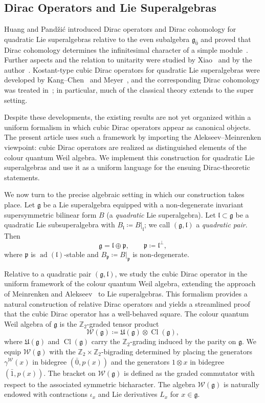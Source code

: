 \documentclass[11pt]{amsart}
\newcommand{\ad}{\operatorname{ad}}
\def\WW{{\mathcal{W}}}
\def\Weil{{\mathcal{W}(\gg)}}
\def\Cl{{\operatorname{Cl}}}
\def\pp{{\mathfrak p}}
\def\ll{{\mathfrak l}}
\def\even{{\mathfrak{g}_{\bar{0}}}}
\def\pp{{\mathfrak p}}
\def\pp{{\mathfrak{p}}}
\def\gg{{\mathfrak{g}}}
\def\ZZ{{\mathbb Z}}
\def\UE{{\mathfrak U}}
\theoremstyle{plain}
\theoremstyle{remark}
\theoremstyle{definition}
\numberwithin{equation}{section}
\theoremstyle{remark}
\begin{document}
\subsection{Dirac Operators and Lie Superalgebras} Huang and Pand\v zi\'c introduced Dirac operators and Dirac cohomology for quadratic Lie superalgebras relative to the even subalgebra $\even$
and proved that Dirac cohomology determines the infinitesimal character of a simple module~\cite{huang2005dirac}. Further aspects and the relation to unitarity were studied by Xiao~\cite{xiao2015dirac}
and by the author~\cite{schmidt}. Kostant-type cubic Dirac operators for quadratic
Lie superalgebras were developed by Kang--Chen~\cite{Chen_Dirac_quadratic} and Meyer~\cite{Meyer},
and the corresponding Dirac cohomology was treated in~\cite{Schmidt_Noja}; in particular,
much of the classical theory extends to the super setting. 

Despite these developments, the existing results are not yet organized within a uniform
formalism in which cubic Dirac operators appear as canonical objects. The present article uses such a framework by importing the
Alekseev--Meinrenken viewpoint: cubic Dirac operators are realized as distinguished
elements of the colour quantum Weil algebra. We implement this construction for quadratic Lie
superalgebras and use it as a uniform language for the ensuing Dirac-theoretic statements.

We now turn to the precise algebraic setting in which our construction takes place. Let $\gg$ be a Lie superalgebra equipped with a non-degenerate invariant supersymmetric bilinear form $B$ (a \emph{quadratic} Lie superalgebra). Let $\ll\subset\gg$ be a quadratic Lie subsuperalgebra with $B_{\ll}\coloneqq B|_{\ll}$; we call $(\gg,\ll)$ a \emph{quadratic pair}. Then
\begin{equation}
\gg=\ll\oplus\pp,\qquad \pp\coloneqq \ll^{\perp},
\end{equation}
where $\pp$ is $\ad(\ll)$-stable and $B_{\pp}\coloneqq B|_{\pp}$ is non-degenerate. 

Relative to a quadratic pair $(\gg,\ll)$, we study the cubic Dirac operator in the uniform framework of the colour quantum Weil algebra, extending the approach of Meinrenken and Alekseev~\cite{Alekseev_Meinrenken} to Lie superalgebras. This formalism provides a natural construction of relative Dirac operators and yields a streamlined proof that the cubic Dirac operator has a well-behaved square. The colour quantum Weil algebra of $\gg$ is the $\ZZ_{2}$-graded tensor product
\begin{equation}
\Weil\coloneqq \UE(\gg)\otimes \Cl(\gg),
\end{equation}
where $\UE(\gg)$ and $\Cl(\gg)$ carry the $\ZZ_{2}$-grading induced by the parity on $\gg$. We equip $\Weil$ with the $\ZZ_{2}\times\ZZ_{2}$-bigrading determined by
placing the generators $\gamma^{\WW}(x)$ in bidegree $(\bar{0},p(x))$ and the generators $1\otimes x$ in bidegree $(\bar{1},p(x))$. 
The bracket on $\Weil$ is defined as the graded commutator with respect to the associated symmetric bicharacter. The algebra $\Weil$ is naturally endowed with contractions $\iota_x$ and Lie derivatives $L_x$ for $x\in\gg$.
\end{document}
